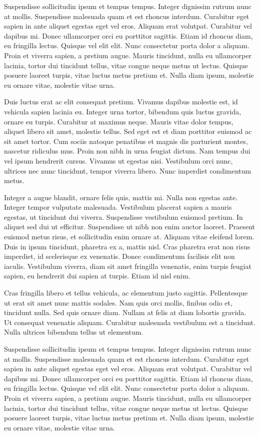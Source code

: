 \documentclass[11pt]{hmcpset}
\begin{document}
\begin{solution}
Suspendisse sollicitudin ipsum et tempus tempus. Integer dignissim rutrum nunc at mollis. Suspendisse malesuada quam et est rhoncus interdum. Curabitur eget sapien in ante aliquet egestas eget vel eros. Aliquam erat volutpat. Curabitur vel dapibus mi. Donec ullamcorper orci eu porttitor sagittis. Etiam id rhoncus diam, eu fringilla lectus. Quisque vel elit elit. Nunc consectetur porta dolor a aliquam. Proin et viverra sapien, a pretium augue. Mauris tincidunt, nulla eu ullamcorper lacinia, tortor dui tincidunt tellus, vitae congue neque metus ut lectus. Quisque posuere laoreet turpis, vitae luctus metus pretium et. Nulla diam ipsum, molestie eu ornare vitae, molestie vitae urna.

Duis luctus erat ac elit consequat pretium. Vivamus dapibus molestie est, id vehicula sapien lacinia eu. Integer urna tortor, bibendum quis luctus gravida, ornare eu turpis. Curabitur at maximus neque. Mauris vitae dolor tempus, aliquet libero sit amet, molestie tellus. Sed eget est et diam porttitor euismod ac sit amet tortor. Cum sociis natoque penatibus et magnis dis parturient montes, nascetur ridiculus mus. Proin non nibh in urna feugiat dictum. Nam tempus dui vel ipsum hendrerit cursus. Vivamus ut egestas nisi. Vestibulum orci nunc, ultrices nec nunc tincidunt, tempor viverra libero. Nunc imperdiet condimentum metus.

Integer a augue blandit, ornare felis quis, mattis mi. Nulla non egestas ante. Integer tempor vulputate malesuada. Vestibulum placerat sapien a mauris egestas, ut tincidunt dui viverra. Suspendisse vestibulum euismod pretium. In aliquet sed dui ut efficitur. Suspendisse ut nibh non enim auctor laoreet. Praesent euismod metus risus, et sollicitudin enim ornare at. Aliquam vitae eleifend lorem. Duis in ipsum tincidunt, pharetra ex a, mattis nisl. Cras pharetra erat non risus imperdiet, id scelerisque ex venenatis. Donec condimentum facilisis elit non iaculis. Vestibulum viverra, diam sit amet fringilla venenatis, enim turpis feugiat sapien, eu hendrerit dui sapien at turpis. Etiam id nisl enim.

Cras fringilla libero et tellus vehicula, ac elementum justo sagittis. Pellentesque ut erat sit amet nunc mattis sodales. Nam quis orci mollis, finibus odio et, tincidunt nulla. Sed quis ornare diam. Nullam at felis at diam lobortis gravida. Ut consequat venenatis aliquam. Curabitur malesuada vestibulum est a tincidunt. Nulla ultrices bibendum tellus ut elementum.

Suspendisse sollicitudin ipsum et tempus tempus. Integer dignissim rutrum nunc at mollis. Suspendisse malesuada quam et est rhoncus interdum. Curabitur eget sapien in ante aliquet egestas eget vel eros. Aliquam erat volutpat. Curabitur vel dapibus mi. Donec ullamcorper orci eu porttitor sagittis. Etiam id rhoncus diam, eu fringilla lectus. Quisque vel elit elit. Nunc consectetur porta dolor a aliquam. Proin et viverra sapien, a pretium augue. Mauris tincidunt, nulla eu ullamcorper lacinia, tortor dui tincidunt tellus, vitae congue neque metus ut lectus. Quisque posuere laoreet turpis, vitae luctus metus pretium et. Nulla diam ipsum, molestie eu ornare vitae, molestie vitae urna.
\end{solution}
\end{document}
